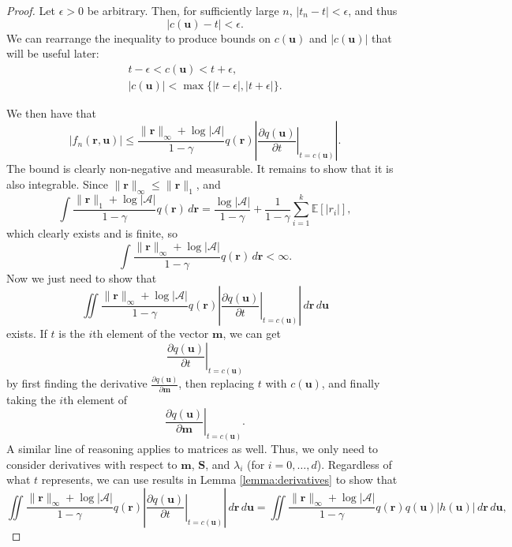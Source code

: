 \documentclass{article}
\theoremstyle{definition}
\newcommand{\fn}{f_n(\mathbf{r}, \mathbf{u})}
\newcommand{\dx}{\,d\mathbf{r}\,d\mathbf{u}}
\newcommand{\rinf}{\lVert \mathbf{r} \rVert_\infty}
\newcommand{\vbound}{\frac{\rinf + \log|\mathcal{A}|}{1 - \gamma}}
\begin{document}
\begin{proof}
  Let $\epsilon > 0$ be arbitrary. Then, for sufficiently large $n$, $|t_n - t|
  < \epsilon$, and thus
  \begin{equation} \label{eq:epsilon_bound}
    |c(\mathbf{u}) - t| < \epsilon.
  \end{equation}
  We can rearrange the inequality to produce bounds on $c(\mathbf{u})$ and
  $|c(\mathbf{u})|$ that will be useful later:
  \begin{align}
    t - \epsilon < c(\mathbf{u}) < t + \epsilon, \nonumber \\
    |c(\mathbf{u})| < \max \{ |t - \epsilon|, |t + \epsilon| \}. \label{eq:c_bound}
  \end{align}
  
  We then have that
  \[
    |\fn| \le \vbound q(\mathbf{r}) \left| \left. \frac{\partial
          q(\mathbf{u})}{\partial t} \right|_{t=c(\mathbf{u})} \right|.
  \]
  The bound is clearly non-negative and measurable. It remains to show that it
  is also integrable. Since $\rinf \le \lVert \mathbf{r} \rVert_1$, and
  \[
    \int \frac{\lVert \mathbf{r} \rVert_1 + \log|\mathcal{A}|}{1 -
      \gamma}q(\mathbf{r}) \,d\mathbf{r} = \frac{\log|\mathcal{A}|}{1 - \gamma}
    + \frac{1}{1 - \gamma} \sum_{i=1}^k \mathbb{E}[|r_i|],
  \]
  which clearly exists and is finite, so
  \[
    \int \vbound q(\mathbf{r}) \,d\mathbf{r} < \infty.
  \]
  Now we just need to show that
  \begin{equation} \label{eq:last_goal}
    \iint \vbound q(\mathbf{r}) \left| \left. \frac{\partial
          q(\mathbf{u})}{\partial t} \right|_{t=c(\mathbf{u})} \right|\dx
  \end{equation}
  exists. If $t$ is the $i$th element of the vector $\mathbf{m}$, we can get
  \[
    \left. \frac{\partial q(\mathbf{u})}{\partial t} \right|_{t = c(\mathbf{u})}
  \]
  by first finding the derivative $\frac{\partial q(\mathbf{u})}{\partial
    \mathbf{m}}$, then replacing $t$ with $c(\mathbf{u})$, and finally taking
  the $i$th element of
  \[
    \left. \frac{\partial q(\mathbf{u})}{\partial \mathbf{m}} \right|_{t =
      c(\mathbf{u})}.
  \]
  A similar line of reasoning applies to matrices as well. Thus, we only need to
  consider derivatives with respect to $\mathbf{m}$, $\mathbf{S}$, and
  $\lambda_i$ (for $i = 0, \dots, d$). Regardless of what $t$ represents, we can
  use results in Lemma \ref{lemma:derivatives} to show that
  \[
    \iint \vbound q(\mathbf{r}) \left| \left. \frac{\partial
          q(\mathbf{u})}{\partial t} \right|_{t=c(\mathbf{u})} \right|\dx =
    \iint \vbound q(\mathbf{r}) q(\mathbf{u}) |h(\mathbf{u})| \dx,
\]
\end{proof}
\end{document}

